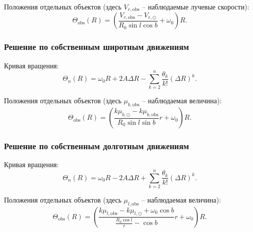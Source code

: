 \documentclass{matmex-diploma-custom}
\begin{document}
Положения отдельных объектов (здесь $V_{r, \mathrm{obs}}$ -- наблюдаемые лучевые скорости):
\begin{equation}
        \Theta_{\mathrm{obs}}(R) = \left( \frac{V_{r, \mathrm{obs}} - V_{r, \odot}}{R_0 \sin{l} \cos{b}} + \omega_0 \right) R.
\end{equation}
\subsubsection{Решение по собственным широтным движениям}
Кривая вращения:
\begin{equation}
        \Theta_n(R) = \omega_0 R + 2A\Delta R - \sum^n_{k = 2} \frac{\theta_k}{k!} \left( \Delta R \right)^k .
\end{equation}

Положения отдельных объектов (здесь $\mu_{b, \mathrm{obs}}$ -- наблюдаемая величина):
\begin{equation}
        \Theta_{\mathrm{obs}}(R) = \left( \frac{k\mu_{b, \odot} - k\mu_{b, \mathrm{obs}}}{R_0 \sin{l} \sin{b}} r + \omega_0 \right) R.
\end{equation}
\subsubsection{Решение по собственным долготным движениям}
Кривая вращения:
\begin{equation} \label{curve_mod_l}
        \Theta_n(R) = \omega_0 R - 2A\Delta R + \sum^n_{k = 2} \frac{\theta_k}{k!} \left( \Delta R \right)^k .
\end{equation}

Положения отдельных объектов (здесь $\mu_{l, \mathrm{obs}}$ -- наблюдаемая величина):
\begin{equation}
        \Theta_{\mathrm{obs}}(R) = \left( \frac{k\mu_{l, \mathrm{obs}} - k\mu_{l, \odot} + \omega_0 \cos{b}}{\frac{R_0 \cos{l}}{r} - \cos{b}} r + \omega_0 \right) R.
\end{equation}
\end{document}
